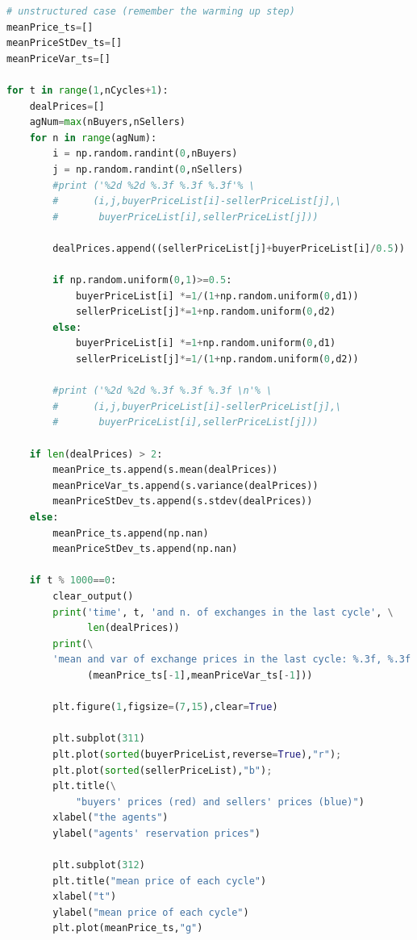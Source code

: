 \documentclass[12pt]{report}
\begin{document}
\begin{lstlisting}[language=Python, caption=The unstructured version, basicstyle=\ttfamily\footnotesize]
# unstructured case (remember the warming up step)
meanPrice_ts=[]
meanPriceStDev_ts=[]
meanPriceVar_ts=[]

for t in range(1,nCycles+1):    
    dealPrices=[]
    agNum=max(nBuyers,nSellers)
    for n in range(agNum):
        i = np.random.randint(0,nBuyers)
        j = np.random.randint(0,nSellers)
        #print ('%2d %2d %.3f %.3f %.3f'% \
        #      (i,j,buyerPriceList[i]-sellerPriceList[j],\
        #       buyerPriceList[i],sellerPriceList[j]))
        
        dealPrices.append((sellerPriceList[j]+buyerPriceList[i]/0.5))
        
        if np.random.uniform(0,1)>=0.5:    
            buyerPriceList[i] *=1/(1+np.random.uniform(0,d1))
            sellerPriceList[j]*=1+np.random.uniform(0,d2)
        else:
            buyerPriceList[i] *=1+np.random.uniform(0,d1)
            sellerPriceList[j]*=1/(1+np.random.uniform(0,d2))

        #print ('%2d %2d %.3f %.3f %.3f \n'% \
        #      (i,j,buyerPriceList[i]-sellerPriceList[j],\
        #       buyerPriceList[i],sellerPriceList[j]))
           
    if len(dealPrices) > 2:
        meanPrice_ts.append(s.mean(dealPrices))
        meanPriceVar_ts.append(s.variance(dealPrices))
        meanPriceStDev_ts.append(s.stdev(dealPrices))
    else:
        meanPrice_ts.append(np.nan)
        meanPriceStDev_ts.append(np.nan)

    if t % 1000==0:
        clear_output()
        print('time', t, 'and n. of exchanges in the last cycle', \
              len(dealPrices))
        print(\
        'mean and var of exchange prices in the last cycle: %.3f, %.3f' %\
              (meanPrice_ts[-1],meanPriceVar_ts[-1]))

        plt.figure(1,figsize=(7,15),clear=True)

        plt.subplot(311)
        plt.plot(sorted(buyerPriceList,reverse=True),"r");
        plt.plot(sorted(sellerPriceList),"b");
        plt.title(\
            "buyers' prices (red) and sellers' prices (blue)")
        xlabel("the agents")
        ylabel("agents' reservation prices")

        plt.subplot(312)
        plt.title("mean price of each cycle")
        xlabel("t")
        ylabel("mean price of each cycle")
        plt.plot(meanPrice_ts,"g")
        

\end{lstlisting}
\end{document}
